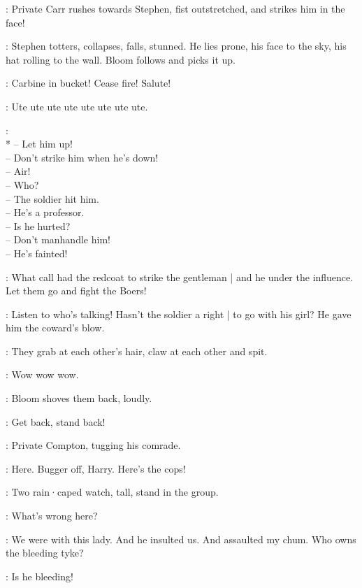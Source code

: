 :
Private Carr rushes towards Stephen,
fist outstretched,
and strikes him in the face!

:
Stephen totters,
collapses,
falls,
stunned.
He lies prone,
his face to the sky,
his hat rolling to the wall.
Bloom follows and picks it up.%

\MajorTweedy[1]:
Carbine in bucket!
Cease fire!
Salute!

\Retriever:
Ute ute ute ute ute ute ute ute.

\Crowd[2]:\\*
-- Let him up!\\
-- Don't strike him when he's down!\\
-- Air!\\
-- Who?\\
-- The soldier hit him.\\
-- He's a professor.\\
-- Is he hurted?\\
-- Don't manhandle him!\\
-- He's fainted!

\Hag[1]:
What call had the redcoat to strike the gentleman |
and he under the influence.
%
Let them go and fight the Boers!

\Bawd[2]:
Listen to who's talking!
Hasn't the soldier a right |
to go with his girl?
He gave him the coward's blow.

:
They grab at each other's hair,
claw at each other and spit.

\Retriever:
Wow wow wow.

:
Bloom shoves them back,
loudly.

\Bloom:
Get back,
stand back!

:
Private Compton,
tugging his comrade.

\Compton:
Here.
Bugger off,
Harry.
Here's the cops!


:
Two rain·caped watch,
tall,
stand in the group.

\FirstWatch[1]:
What's wrong here?

\Compton:
We were with this lady.
And he insulted us.
And assaulted my chum.
Who owns the bleeding tyke?

\Cissy:
Is he bleeding!

